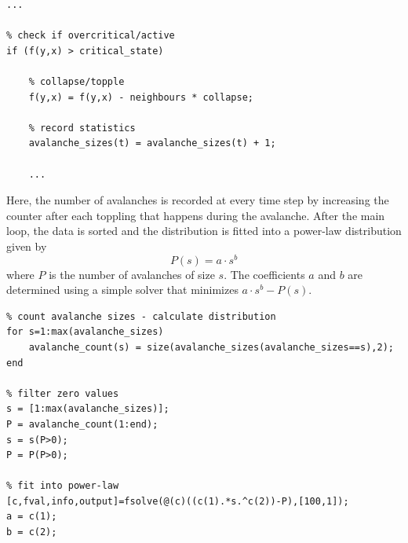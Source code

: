 \begin{lstlisting}
...

% check if overcritical/active
if (f(y,x) > critical_state)

	% collapse/topple
	f(y,x) = f(y,x) - neighbours * collapse;

	% record statistics
	avalanche_sizes(t) = avalanche_sizes(t) + 1;

	...
\end{lstlisting}

Here, the number of avalanches is recorded at every time step by increasing the counter after each toppling that happens during the avalanche. After the main loop, the data is sorted and the distribution is fitted into a power-law distribution given by
\[
P(s) = a \cdot s^b
\]
where $P$ is the number of avalanches of size $s$. The coefficients $a$ and $b$ are determined using a simple solver that minimizes $a \cdot s^b-P(s)$.

\begin{lstlisting}
% count avalanche sizes - calculate distribution
for s=1:max(avalanche_sizes)
	avalanche_count(s) = size(avalanche_sizes(avalanche_sizes==s),2);
end

% filter zero values
s = [1:max(avalanche_sizes)];
P = avalanche_count(1:end);
s = s(P>0);
P = P(P>0);

% fit into power-law
[c,fval,info,output]=fsolve(@(c)((c(1).*s.^c(2))-P),[100,1]);
a = c(1);
b = c(2);

\end{lstlisting}


